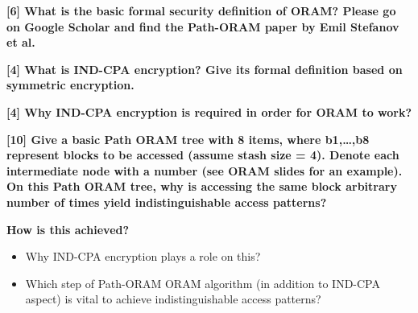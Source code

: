 \documentclass[letterpaper,11pt,notitlepage,fleqn]{article}
\begin{document}
 
 
\noindent \textbf{[6] What is the basic formal security definition of ORAM? Please go on Google Scholar and find the Path-ORAM paper by Emil Stefanov et al.} 
 
 
 
\noindent \textbf{[4] What is IND-CPA encryption? Give its formal definition based on symmetric encryption.}
 
 
 
\noindent \textbf{[4] Why IND-CPA encryption is required in order for ORAM to work?}
 
 
\noindent \textbf{[10] Give a basic Path ORAM tree with 8 items, where b1,…,b8 represent blocks to be accessed (assume stash size = 4). Denote each intermediate node with a number (see ORAM slides for an example). On this Path ORAM tree, why is accessing the same block arbitrary number of times yield indistinguishable access patterns?} 

\noindent \textbf{How is this achieved?}
\begin{itemize}
    \item Why IND-CPA encryption plays a role on this?
    \item Which  step  of  Path-ORAM  ORAM  algorithm  (in  addition  to  IND-CPA aspect) is vital to achieve indistinguishable access patterns?
\end{itemize}

\medskip


\end{document}
